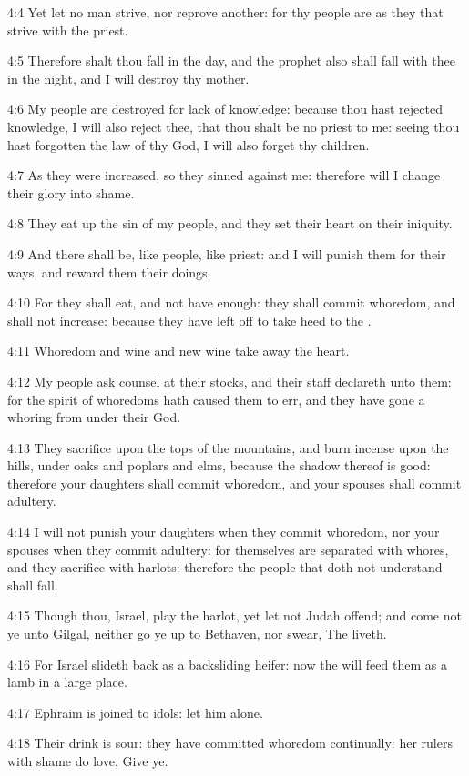 4:4 Yet let no man strive, nor reprove another: for thy people are as they that strive with the priest.

4:5 Therefore shalt thou fall in the day, and the prophet also shall fall with thee in the night, and I will destroy thy mother.

4:6 My people are destroyed for lack of knowledge: because thou hast rejected knowledge, I will also reject thee, that thou shalt be no priest to me: seeing thou hast forgotten the law of thy God, I will also forget thy children.

4:7 As they were increased, so they sinned against me: therefore will I change their glory into shame.

4:8 They eat up the sin of my people, and they set their heart on their iniquity.

4:9 And there shall be, like people, like priest: and I will punish them for their ways, and reward them their doings.

4:10 For they shall eat, and not have enough: they shall commit whoredom, and shall not increase: because they have left off to take heed to the \LORD.

4:11 Whoredom and wine and new wine take away the heart.

4:12 My people ask counsel at their stocks, and their staff declareth unto them: for the spirit of whoredoms hath caused them to err, and they have gone a whoring from under their God.

4:13 They sacrifice upon the tops of the mountains, and burn incense upon the hills, under oaks and poplars and elms, because the shadow thereof is good: therefore your daughters shall commit whoredom, and your spouses shall commit adultery.

4:14 I will not punish your daughters when they commit whoredom, nor your spouses when they commit adultery: for themselves are separated with whores, and they sacrifice with harlots: therefore the people that doth not understand shall fall.

4:15 Though thou, Israel, play the harlot, yet let not Judah offend; and come not ye unto Gilgal, neither go ye up to Bethaven, nor swear, The \LORD liveth.

4:16 For Israel slideth back as a backsliding heifer: now the \LORD will feed them as a lamb in a large place.

4:17 Ephraim is joined to idols: let him alone.

4:18 Their drink is sour: they have committed whoredom continually: her rulers with shame do love, Give ye.

